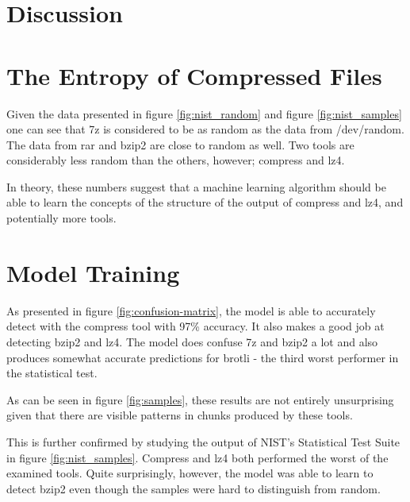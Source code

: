 \documentclass[conference]{IEEEtran}
\begin{document}
\section{Discussion}

\section{The Entropy of Compressed Files}

Given the data presented in figure \ref{fig:nist_random} and figure \ref{fig:nist_samples} one can see that 7z is considered to be as random as the data from /dev/random. The data from rar and bzip2 are close to random as well. Two tools are considerably less random than the others, however; compress and lz4.

In theory, these numbers suggest that a machine learning algorithm should be able to learn the concepts of the structure of the output of compress and lz4, and potentially more tools\cite{lakshmanan2021machine}.

\section{Model Training}

As presented in figure \ref{fig:confusion-matrix}, the model is able to accurately detect with the compress tool with 97\% accuracy. It also makes a good job at detecting bzip2 and lz4. The model does confuse 7z and bzip2 a lot and also produces somewhat accurate predictions for brotli - the third worst performer in the statistical test.

As can be seen in figure \ref{fig:samples}, these results are not entirely unsurprising given that there are visible patterns in chunks produced by these tools.

This is further confirmed by studying the output of NIST's Statistical Test Suite in figure \ref{fig:nist_samples}. Compress and lz4 both performed the worst of the examined tools. Quite surprisingly, however, the model was able to learn to detect bzip2 even though the samples were hard to distinguish from random.

\end{document}
